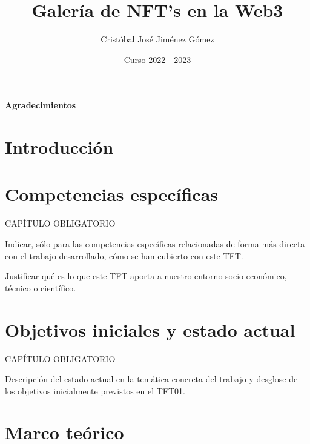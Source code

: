 \documentclass[oneside,12pt]{book}
\title{Galería de NFT's en la Web3}
\author{Cristóbal José Jiménez Gómez}
\date{Curso 2022 - 2023}
\begin{document}


%

\newpage
{}
{\Large{\textbf{Agradecimientos}}}


\clearpage

\tableofcontents

\clearpage
{}

\chapter{Introducción}

\newpage
\chapter{Competencias específicas}
%
CAPÍTULO OBLIGATORIO

Indicar, sólo para las competencias específicas relacionadas de forma más directa con el trabajo desarrollado, cómo se han cubierto con este TFT.

Justificar qué es lo que este TFT aporta a nuestro entorno socio-económico, técnico o científico.

\newpage
\chapter{Objetivos iniciales y estado actual}

CAPÍTULO OBLIGATORIO

Descripción del estado actual en la temática concreta del trabajo y desglose de los objetivos inicialmente previstos en el TFT01.
\newpage
\begin{comment}
        CAPÍTULO OBLIGATORIO
        Metodología aplicada y desarrollo del trabajo en sus distintas fases, decisiones de diseño, herramientas empleadas.
        Si el trabajo incluye software desarrollado, deberán seleccionarse las secciones más relevantes del mismo y comentarlas en la memoria.
        Ajuste a la planificación inicialmente prevista.
        Modificación en los objetivos planteados.
\end{comment}
\chapter{Marco teórico}
\newpage
\end{document}
